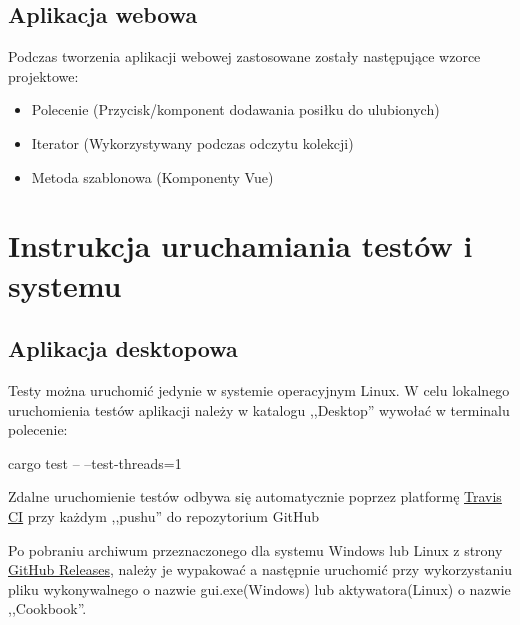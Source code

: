 \documentclass[12pt,a4paper]{article}
\begin{document}
		\subsection{Aplikacja webowa}	
		Podczas tworzenia aplikacji webowej zastosowane zostały następujące wzorce projektowe:
		\begin{itemize}
			\item Polecenie (Przycisk/komponent dodawania posiłku do ulubionych)
			\item Iterator (Wykorzystywany podczas odczytu kolekcji)
			\item Metoda szablonowa (Komponenty Vue)
			\end{itemize} 
	\newpage
	
	\section{Instrukcja uruchamiania testów i systemu}
		\subsection{Aplikacja desktopowa}

			\indent Testy można uruchomić jedynie w systemie operacyjnym Linux. W celu lokalnego uruchomienia testów aplikacji należy w katalogu ,,Desktop''
			wywołać w terminalu polecenie:
			\begin{tcolorbox}[minipage,colback=white,arc=0pt,outer arc=0pt, fontupper=\normalsize]
				\center					
					cargo test -- --test-threads=1
			\end{tcolorbox}

			\indent Zdalne uruchomienie testów odbywa się automatycznie poprzez platformę \href{https://www.travis-ci.com/github/MacKarp/Cookbook}{Travis CI} 
			przy każdym ,,pushu'' do repozytorium GitHub
			 
			\indent Po pobraniu archiwum przeznaczonego dla systemu Windows lub Linux z strony \href{https://github.com/MacKarp/Cookbook/releases}{GitHub Releases},
			należy je wypakować a następnie uruchomić przy wykorzystaniu pliku wykonywalnego o nazwie gui.exe(Windows) lub aktywatora(Linux) o nazwie ,,Cookbook''. 		
\end{document}
